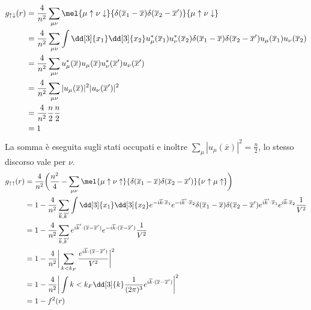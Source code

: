\begin{equation*}
    \begin{aligned}
        g_{\uparrow\downarrow}(r) & = \frac{4}{n^2}\sum_{\mu\nu}\mel{\mu\uparrow\nu\downarrow}{\delta(\overline{x}_1-\overline x)\delta(\overline{x}_2-\overline{x}')}{\mu\uparrow\nu\downarrow} \\
        & = \frac{4}{n^2}\sum_{\mu\nu}\int \dd[3]{x_1}\dd[3]{x_2}u_\mu^*(\overline{x}_1)u_\nu^*(\overline{x}_2)\delta(\overline{x}_1-\overline{x})\delta(\overline{x}_2-\overline{x}')u_\mu(\overline{x}_1)u_\nu(\overline{x}_2) \\
        & = \frac{4}{n^2}\sum_{\mu\nu}u_\mu^*(\overline x)u_\mu(\overline x)u_\nu^*(\overline{x}')u_\nu(\overline{x}') \\
        & = \frac{4}{n^2}\sum_{\mu\nu}|u_\mu(\overline x)|^2|u_\nu(\overline{x}')|^2 \\
        & = \frac{4}{n^2}\frac n2 \frac n2 \\
        & = 1
    \end{aligned}
\end{equation*}
La somma è eseguita sugli stati occupati e inoltre $\sum_\mu|u_\mu(\overline{x})|^2=\frac n2$, lo stesso discorso vale per $\nu$.
\begin{equation*}
    \begin{aligned}
        g_{\uparrow\uparrow}(r) & = \frac{4}{n^2}\bigg(\frac {n^2}{4} - \sum_{\mu\nu}\mel{\mu\uparrow\nu\uparrow}{\delta(\overline{x}_1-\overline{x})\delta(\overline{x}_2-\overline{x}')}{\nu\uparrow\mu\uparrow}\bigg) \\
        & = 1 - \frac{4}{n^2}\sum_{\overline k, \overline{k}'}\int\dd[3]{x_1}\dd[3]{x_2}e^{-i\overline k \cdot \overline{x}_1}e^{-i\overline{k}'\cdot\overline{x}_2}\delta(\overline{x}_1-\overline{x})\delta(\overline{x}_2-\overline{x}')e^{i\overline{k}'\cdot\overline{x}_1}e^{i\overline{k}\cdot\overline{x}_2}\frac{1}{V^2} \\
        & = 1 - \frac{4}{n^2}\sum_{\overline k, \overline{k}'}e^{i\overline{k}'\cdot(\overline{x}-\overline{x}')}e^{-i\overline{k}\cdot(\overline{x}-\overline{x}')}\frac{1}{V^2} \\
        & = 1 - \frac{4}{n^2}\bigg|\sum_{k<k_F}\frac{e^{i\overline{k}\cdot(\overline{x}-\overline{x}')}}{V^2}\bigg|^2 \\
        & = 1 - \frac{4}{n^2}\bigg|\int{k<k_F}\dd[3]{k}\frac{1}{(2\pi)^3} e^{i\overline{k}\cdot(\overline{x}-\overline{x}')}\bigg|^2 \\
        & = 1 -f^2(r)
    \end{aligned}
\end{equation*}
